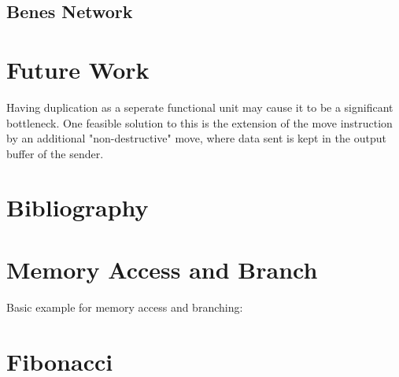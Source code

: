 \documentclass[adraft]{eptcs}
\begin{document}
		\subsection{Benes Network}	  

	\section{Future Work}
		Having duplication as a seperate functional unit may cause it to be a significant bottleneck.
		One feasible solution to this is the extension of the move instruction by an additional "non-destructive" move, where data sent is kept in the output buffer of the sender.
		

	\newpage
	\section{Bibliography}
		
		
	\newpage
	
	\begin{appendices}
		\newpage
		\section{Memory Access and Branch}
			\label{app:simple}
			Basic example for memory access and branching:
			
		
		\newpage
		\section{Fibonacci}
			\label{app:fib}
			
	\end{appendices}
	
\end{document}
